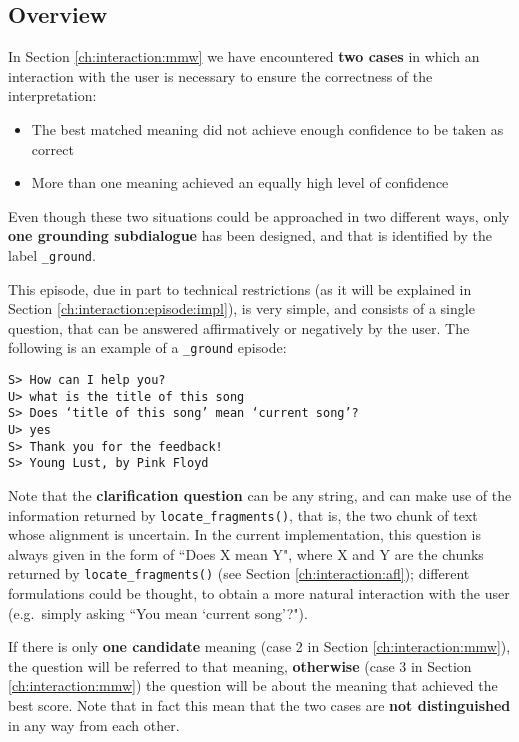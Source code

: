 \subsection{Overview}
In Section \ref{ch:interaction:mmw} we have encountered \textbf{two cases} in which an interaction with the user is necessary to ensure the correctness of the interpretation:
\begin{itemize}
	\item The best matched meaning did not achieve enough confidence to be taken as correct
	\item More than one meaning achieved an equally high level of confidence
\end{itemize}

Even though these two situations could be approached in two different ways, only \textbf{one grounding subdialogue} has been designed, and that is identified by the label \texttt{\_ground}.

This episode, due in part to technical restrictions (as it will be explained in Section \ref{ch:interaction:episode:impl}), is very simple, and consists of a single question, that can be answered affirmatively or negatively by the user. The following is an example of a \texttt{\_ground} episode:

\texttt{S> How can I help you? \\
U> what is the title of this song \\
S> Does `title of this song' mean `current song'? \\
U> yes \\
S> Thank you for the feedback! \\
S> Young Lust, by Pink Floyd}

Note that the \textbf{clarification question} can be any string, and can make use of the information returned by \texttt{locate\_fragments()}, that is, the two chunk of text whose alignment is uncertain. In the current implementation, this question is always given in the form of ``Does X mean Y", where X and Y are the chunks returned by \texttt{locate\_fragments()} (see Section \ref{ch:interaction:afl}); different formulations could be thought, to obtain a more natural interaction with the user (e.g.\ simply asking ``You mean `current song'?").

If there is only \textbf{one candidate} meaning (case 2 in Section \ref{ch:interaction:mmw}), the question will be referred to that meaning, \textbf{otherwise} (case 3 in Section \ref{ch:interaction:mmw}) the question will be about the meaning that achieved the best score. Note that in fact this mean that the two cases are \textbf{not distinguished} in any way from each other.

